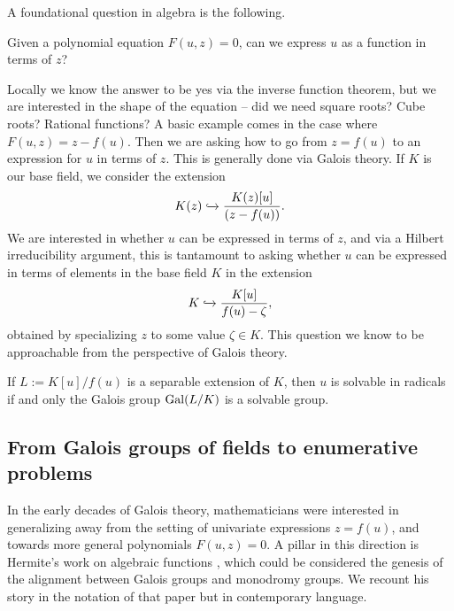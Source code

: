 \documentclass[11pt]{amsart}
\begin{document}
A foundational question in algebra is the following.

\begin{question}\label{solvable-bivariate-polynomial} 
Given a polynomial equation $F(u,z)=0$, can we express $u$ as a function in terms of $z$?
\end{question}

Locally we know the answer to be yes via the inverse function theorem, but we are interested in the shape of the equation -- did we need square roots? Cube roots? Rational functions? A basic example comes in the case where $F(u,z) = z-f(u)$. Then we are asking how to go from $z = f(u)$ to an expression for $u$ in terms of $z$. This is generally done via Galois theory. If $K$ is our base field, we consider the extension
\begin{align*}
    K(z) \xhookrightarrow{} \frac{K(z)[u]}{(z-f(u))}.
\end{align*}
We are interested in whether $u$ can be expressed in terms of $z$, and via a Hilbert irreducibility argument, this is tantamount to asking whether $u$ can be expressed in terms of elements in the base field $K$ in the extension
\begin{align*}
    K \xhookrightarrow{} \frac{K[u]}{f(u)-\zeta},
\end{align*}
obtained by specializing $z$ to some value $\zeta\in K$. This question we know to be approachable from the perspective of Galois theory.

\begin{theorem}[Galois] If $L :=K[u]/f(u)$ is a separable extension of $K$, then $u$ is solvable in radicals if and only the Galois group $\mathrm{Gal}(L/ K)$ is a solvable group.
\end{theorem}

\subsection{From Galois groups of fields to enumerative problems}

In the early decades of Galois theory, mathematicians were interested in generalizing  away from the setting of univariate expressions $z = f(u)$, and towards more general polynomials $F(u,z) = 0$. A pillar in this direction is Hermite's work on algebraic functions \cite{Hermite51}, which could be considered the genesis of the alignment between Galois groups and monodromy groups. We recount his story in the notation of that paper but in contemporary language.
\end{document}
